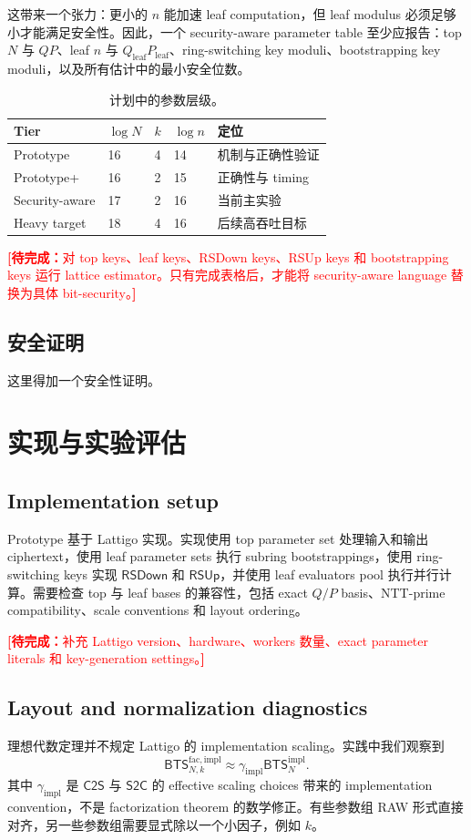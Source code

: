 \documentclass[UTF8,11pt]{article}
\newcommand{\todo}[1]{\textcolor{red}{\textbf{[待完成：}#1\textbf{]}}}
\newcommand{\RSDown}{\mathsf{RSDown}}
\newcommand{\RSUp}{\mathsf{RSUp}}
\newcommand{\CtwoS}{\mathsf{C2S}}
\newcommand{\StwoC}{\mathsf{S2C}}
\newcommand{\BTS}{\mathsf{BTS}}
\theoremstyle{definition}
\theoremstyle{plain}
\begin{document}
这带来一个张力：更小的 $n$ 能加速 leaf computation，但 leaf modulus 必须足够小才能满足安全性。因此，一个 security-aware parameter table 至少应报告：top $N$ 与 $QP$、leaf $n$ 与 $Q_{\mathrm{leaf}}P_{\mathrm{leaf}}$、ring-switching key moduli、bootstrapping key moduli，以及所有估计中的最小安全位数。

\begin{table}[h]
\centering
\begin{tabular}{lllll}
\toprule
Tier & $\log N$ & $k$ & $\log n$ & 定位\\
\midrule
Prototype & 16 & 4 & 14 & 机制与正确性验证\\
Prototype+ & 16 & 2 & 15 & 正确性与 timing\\
Security-aware & 17 & 2 & 16 & 当前主实验\\
Heavy target & 18 & 4 & 16 & 后续高吞吐目标\\
\bottomrule
\end{tabular}
\caption{计划中的参数层级。}
\end{table}

\todo{对 top keys、leaf keys、RSDown keys、RSUp keys 和 bootstrapping keys 运行 lattice estimator。只有完成表格后，才能将 security-aware language 替换为具体 bit-security。}


\subsection{安全证明}

这里得加一个安全性证明。


\section{实现与实验评估}

\subsection{Implementation setup}
Prototype 基于 Lattigo 实现。实现使用 top parameter set 处理输入和输出 ciphertext，使用 leaf parameter sets 执行 subring bootstrappings，使用 ring-switching keys 实现 $\RSDown$ 和 $\RSUp$，并使用 leaf evaluators pool 执行并行计算。需要检查 top 与 leaf bases 的兼容性，包括 exact $Q/P$ basis、NTT-prime compatibility、scale conventions 和 layout ordering。

\todo{补充 Lattigo version、hardware、workers 数量、exact parameter literals 和 key-generation settings。}

\subsection{Layout and normalization diagnostics}
理想代数定理并不规定 Lattigo 的 implementation scaling。实践中我们观察到
\[
\BTS^{\mathrm{fac,impl}}_{N,k}\approx \gamma_{\mathrm{impl}}\BTS_N^{\mathrm{impl}}.
\]
其中 $\gamma_{\mathrm{impl}}$ 是 $\CtwoS$ 与 $\StwoC$ 的 effective scaling choices 带来的 implementation convention，不是 factorization theorem 的数学修正。有些参数组 RAW 形式直接对齐，另一些参数组需要显式除以一个小因子，例如 $k$。
\end{document}
